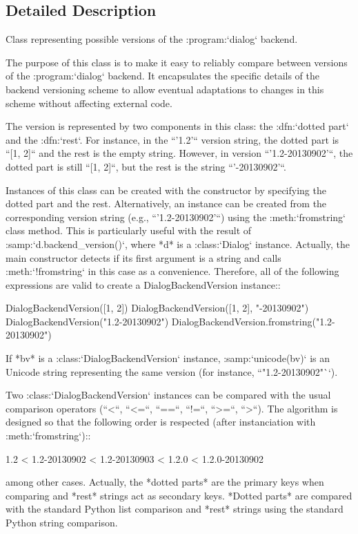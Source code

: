 \subsection{Detailed Description}
\begin{DoxyVerb}Class representing possible versions of the :program:`dialog` backend.

The purpose of this class is to make it easy to reliably compare
between versions of the :program:`dialog` backend. It encapsulates
the specific details of the backend versioning scheme to allow
eventual adaptations to changes in this scheme without affecting
external code.

The version is represented by two components in this class: the
:dfn:`dotted part` and the :dfn:`rest`. For instance, in the
``'1.2'`` version string, the dotted part is ``[1, 2]`` and the rest
is the empty string. However, in version ``'1.2-20130902'``, the
dotted part is still ``[1, 2]``, but the rest is the string
``'-20130902'``.

Instances of this class can be created with the constructor by
specifying the dotted part and the rest. Alternatively, an instance
can be created from the corresponding version string (e.g.,
``'1.2-20130902'``) using the :meth:`fromstring` class method. This
is particularly useful with the result of
:samp:`{d}.backend_version()`, where *d* is a :class:`Dialog`
instance. Actually, the main constructor detects if its first
argument is a string and calls :meth:`!fromstring` in this case as a
convenience. Therefore, all of the following expressions are valid
to create a DialogBackendVersion instance::

  DialogBackendVersion([1, 2])
  DialogBackendVersion([1, 2], "-20130902")
  DialogBackendVersion("1.2-20130902")
  DialogBackendVersion.fromstring("1.2-20130902")

If *bv* is a :class:`DialogBackendVersion` instance,
:samp:`unicode({bv})` is an Unicode string representing the same
version (for instance, ``"1.2-20130902"``).

Two :class:`DialogBackendVersion` instances can be compared with the
usual comparison operators (``<``, ``<=``, ``==``, ``!=``, ``>=``,
``>``). The algorithm is designed so that the following order is
respected (after instanciation with :meth:`fromstring`)::

  1.2 < 1.2-20130902 < 1.2-20130903 < 1.2.0 < 1.2.0-20130902

among other cases. Actually, the *dotted parts* are the primary keys
when comparing and *rest* strings act as secondary keys. *Dotted
parts* are compared with the standard Python list comparison and
*rest* strings using the standard Python string comparison.\end{DoxyVerb}
 

